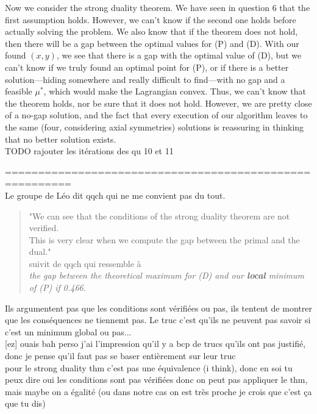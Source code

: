 \documentclass{article}
\begin{document}
Now we consider the strong duality theorem. We have seen in question 6 that the first assumption holds. However, we can't know if the second one holds before actually solving the problem. We also know that if the theorem does not hold, then there will be a gap between the optimal values for (P) and (D). With our found $(x, y)$, we see that there is a gap with the optimal value of (D), but we can't know if we truly found an optimal point for (P), or if there is a better solution---hiding somewhere and really difficult to find---with no gap and a feasible $\mu^*$, which would make the Lagrangian convex. Thus, we can't know that the theorem holds, nor be sure that it does not hold. However, we are pretty close of a no-gap solution, and the fact that every execution of our algorithm leaves to the same (four, considering axial symmetries) solutions is reassuring in thinking that no better solution exists.\\


TODO rajouter les itérations des qu 10 et 11

\pagebreak
========================================================\\
Le groupe de Léo dit qqch qui ne me convient pas du tout.
\begin{quote}
"We can see that the conditions of the strong duality theorem are not verified.\\
This is very clear when we compute the gap between the primal and the dual."\\
suivit de qqch qui ressemble à\\
\textit{the gap between the theoretical maximum for (D) and our \textbf{local} minimum of (P)  if 0.466.}
\end{quote}
Ils argumentent pas que les conditions sont vérifiées ou pas, ils tentent de montrer que les conséquences ne tiennemt pas. Le truc c'est qu'ils ne peuvent pas savoir si c'est un minimum global ou pas...\\

[ez] ouais bah perso j'ai l'impression qu'il y a bcp de trucs qu'ils ont pas justifié, donc je pense qu'il faut pas se baser entièrement sur leur truc\\
pour le strong duality thm c'est pas une équivalence (i think), donc en soi tu peux dire oui les conditions sont pas vérifiées donc on peut pas appliquer le thm, mais maybe on a égalité (ou dans notre cas on est très proche je crois que c'est ça que tu dis)
\end{document}
